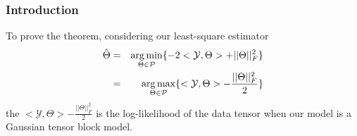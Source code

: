 \documentclass{article}
\newtheorem{remark}{Remark}
\DeclareMathOperator*{\mcr}{MCR}
\DeclareMathOperator*{\cer}{CER}
\begin{document}
\begin{appendices}
%
%

\subsubsection{Introduction}
To prove the theorem, considering our least-square estimator 
\begin{eqnarray*}
\hat{\Theta} &=& \displaystyle\operatorname*{arg\,min}_{\Theta\in\mathcal{P}}\{-2<\mathcal{Y},\Theta>+||\Theta||_F^2\}\\
&=&\displaystyle\operatorname*{arg\,max}_{\Theta\in\mathcal{P}}\{<\mathcal{Y},\Theta>-\frac{||\Theta||_F^2}{2}\}
\end{eqnarray*}
the $<\mathcal{Y},\Theta>-\frac{||\Theta||_F^2}{2}$ is the log-likelihood of the data tensor when our model is a Gaussian tensor block model.


\end{appendices}
\end{document}
